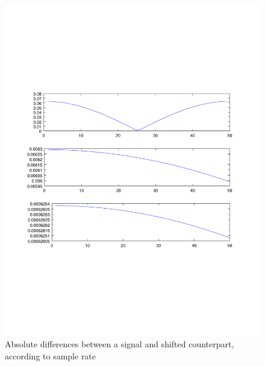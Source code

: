 \begin{figure}
\includegraphics[scale=0.4]{Figures/absvals}
\caption{Absolute differences between a signal and shifted counterpart, according to sample rate}
\label{fig:absvals}
\end{figure}
